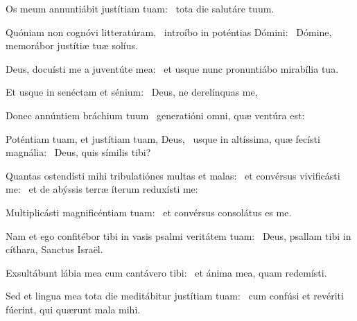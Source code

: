 \item Os meum annuntiábit justítiam tuam:~\psstar{} tota die salutáre tuum.

\item Quóniam non cognóvi litteratúram,~\pscross{} introíbo in poténtias Dómini:~\psstar{} Dómine, memorábor justítiæ tuæ solíus.

\item Deus, docuísti me a juventúte mea:~\psstar{} et usque nunc pronuntiábo mirabília tua.

\item Et usque in senéctam et sénium:~\psstar{} Deus, ne derelínquas me,

\item Donec annúntiem bráchium tuum~\psstar{} generatióni omni, quæ ventúra est:

\item Poténtiam tuam, et justítiam tuam, Deus,~\pscross{} usque in altíssima, quæ fecísti magnália:~\psstar{} Deus, quis símilis tibi?

\item Quantas ostendísti mihi tribulatiónes multas et malas:~\pscross{} et convérsus vivificásti me:~\psstar{} et de abýssis terræ íterum reduxísti me:

\item Multiplicásti magnificéntiam tuam:~\psstar{} et convérsus consolátus es me.

\item Nam et ego confitébor tibi in vasis psalmi veritátem tuam:~\psstar{} Deus, psallam tibi in cíthara, Sanctus Israël.

\item Exsultábunt lábia mea cum cantávero tibi:~\psstar{} et ánima mea, quam redemísti.

\item Sed et lingua mea tota die meditábitur justítiam tuam:~\psstar{} cum confúsi et revériti fúerint, qui quærunt mala mihi.

